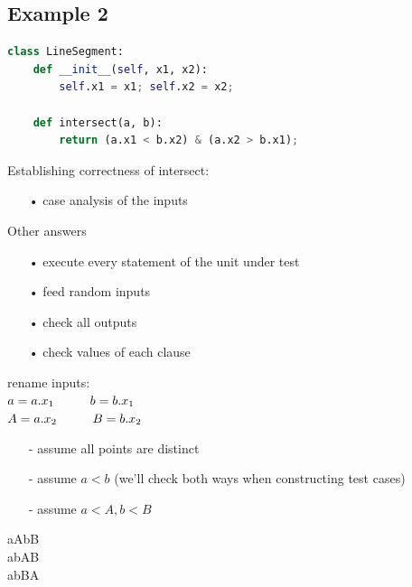 \documentclass[10pt,usletter]{article}
\newcommand{\tab}[1][1cm]{\hspace*{#1}}
\begin{document}
\subsection{Example 2}
\begin{lstlisting}[language=Python]
class LineSegment:
	def __init__(self, x1, x2):
		self.x1 = x1; self.x2 = x2;
		
	def intersect(a, b):
		return (a.x1 < b.x2) & (a.x2 > b.x1);
\end{lstlisting}
Establishing correctness of intersect:
\begin{enumerate}
\item[•] case analysis of the inputs
\end{enumerate}
Other answers
\begin{enumerate}
\item[•] execute every statement of the unit under test
\item[•] feed random inputs
\item[•] check all outputs
\item[•] check values of each clause
\end{enumerate}
rename inputs: \\
$a = a.x_1 \tab b = b.x_1$\\
$A = a.x_2 \tab B = b.x_2$
\begin{enumerate}
\item[-]assume all points are distinct\\
\item[-]assume $a < b$ (we'll check both ways when constructing test cases) \\
\item[-]assume $a < A, b < B$
\end{enumerate}
aAbB\\
abAB\\
abBA
\end{document}
